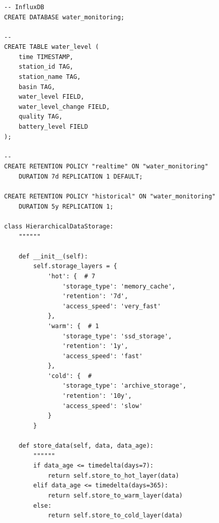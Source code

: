 \hypertarget{section-72}{%
\subsubsection{}\label{section-72}}

\hypertarget{section-73}{%
\paragraph{}\label{section-73}}

\begin{lstlisting}[style=sql]
-- InfluxDB
CREATE DATABASE water_monitoring;

-- 
CREATE TABLE water_level (
    time TIMESTAMP,
    station_id TAG,
    station_name TAG,
    basin TAG,
    water_level FIELD,
    water_level_change FIELD,
    quality TAG,
    battery_level FIELD
);

-- 
CREATE RETENTION POLICY "realtime" ON "water_monitoring" 
    DURATION 7d REPLICATION 1 DEFAULT;
    
CREATE RETENTION POLICY "historical" ON "water_monitoring" 
    DURATION 5y REPLICATION 1;
\end{lstlisting}

\hypertarget{section-74}{%
\paragraph{}\label{section-74}}

\begin{lstlisting}[style=python]
class HierarchicalDataStorage:
    """"""
    
    def __init__(self):
        self.storage_layers = {
            'hot': {  # 7
                'storage_type': 'memory_cache',
                'retention': '7d',
                'access_speed': 'very_fast'
            },
            'warm': {  # 1
                'storage_type': 'ssd_storage',
                'retention': '1y',
                'access_speed': 'fast'
            },
            'cold': {  # 
                'storage_type': 'archive_storage',
                'retention': '10y',
                'access_speed': 'slow'
            }
        }
    
    def store_data(self, data, data_age):
        """"""
        if data_age <= timedelta(days=7):
            return self.store_to_hot_layer(data)
        elif data_age <= timedelta(days=365):
            return self.store_to_warm_layer(data)
        else:
            return self.store_to_cold_layer(data)
\end{lstlisting}

